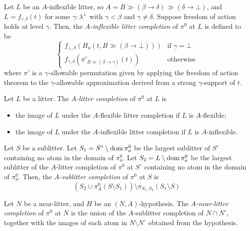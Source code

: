 \documentclass{article}
\begin{document}
\begin{definition}
    Let \( L \) be an \( A \)-inflexible litter, so \( A = B \gg (\beta \longrightarrow \delta) \gg (\delta \longrightarrow \bot) \), and \( L = f_{\gamma,\delta}(t) \) for some \( \gamma : \lambda^\bot \) with \( \gamma < \beta \) and \( \gamma \neq \delta \).
    Suppose freedom of action holds at level \( \gamma \).
    Then, the \emph{\( A \)-inflexible litter completion} of \( \pi^0 \) at \( L \) is defined to be
    \[ \begin{cases}
        f_{\bot,\delta}(H_a(t, B \gg (\beta \longrightarrow \bot))) & \text{if } \gamma = \bot \\
        f_{\gamma,\delta}(\pi'_{B \gg (\beta \longrightarrow \gamma)}(t)) & \text{otherwise}
    \end{cases} \]
    where \( \pi' \) is a \( \gamma \)-allowable permutation given by applying the freedom of action theorem to the \( \gamma \)-allowable approximation derived from a strong \( \gamma \)-support of \( t \).
\end{definition}
\begin{definition}
    Let \( L \) be a litter.
    The \emph{\( A \)-litter completion} of \( \pi^0 \) at \( L \) is
    \begin{itemize}
        \item the image of \( L \) under the \( A \)-flexible litter completion if \( L \) is \( A \)-flexible;
        \item the image of \( L \) under the \( A \)-inflexible litter completion if \( L \) is \( A \)-inflexible.
    \end{itemize}
\end{definition}
\begin{definition}
    Let \( S \) be a sublitter.
    Let \( S_1 = S^\circ \setminus \operatorname{dom} \pi^0_a \) be the largest sublitter of \( S^\circ \) containing no atom in the domain of \( \pi^0_a \).
    Let \( S_2 = L \setminus \operatorname{dom} \pi^0_a \) be the largest sublitter of the \( A \)-litter completion of \( \pi^0 \) at \( S^\circ \) containing no atom in the domain of \( \pi^0_a \).
    Then, the \emph{\( A \)-sublitter completion} of \( \pi^0 \) at \( S \) is
    \[ (S_2 \cup \pi^0_A(S \setminus S_1)) \setminus \pi_{S_1,S_2}(S_1 \setminus S) \]
\end{definition}
\begin{definition}
    Let \( N \) be a near-litter, and \( H \) be an \( (N, A) \)-hypothesis.
    The \emph{\( A \)-near-litter completion} of \( \pi^0 \) at \( N \) is the union of the \( A \)-sublitter completion of \( N \cap N^\circ \), together with the images of each atom in \( N \setminus N^\circ \) obtained from the hypothesis.
\end{definition}
\end{document}
